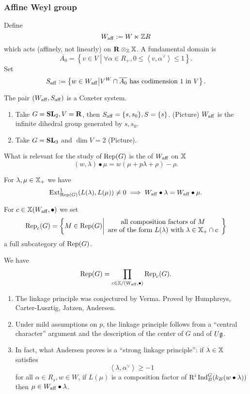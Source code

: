 		\subsubsection{Affine Weyl group}
		Define
		\[
			W_{\mathrm{aff}} := W\ltimes \mathbb Z R
		\]
		which acts (affinely, not linearly) on $\mathbf{R}\otimes_\mathbb Z \mathbb{X}$. A fundamental domain is
		\[
			\overline{A_0} = \left\{ v\in V \middle| \forall \alpha\in R_+, 0\le \left<v,\alpha
			^{\vee} \right>\le 1 \right\} .
		\]
		Set
		\[
			S_{\mathrm{aff}}:= \left\{ w\in W_{\mathrm{aff}} \middle| V^{W}\cap \overline{A_0}\text{ has codimension
			1 in }V \right\}.
		\]
		\begin{fact}
			The pair $(W_{\mathrm{aff}},S_{\mathrm{aff}})$ is a Coxeter system.
		\end{fact}
		\begin{example}\leavevmode
			\begin{enumerate}[(1)]
				\item Take $G=\mathbf{SL}_2, V=\mathbf{R}$, then $S_{\mathrm{aff}}=\{s,s_0\} , S=\{s\} $. (Picture) $W_{\mathrm{aff}}$ is
					the infinite dihedral group generated by $s,s_0$.
				\item Take $G=\mathbf{SL}_3$ and $\dim V=2$ (Picture).
			\end{enumerate}
		\end{example}
		What is relevant for the study of $\operatorname{Rep}(G)$ is the  of $W_{\mathrm{aff}}$ on $\mathbb{X}$
		\[
			(w,\lambda)\bullet \mu = w(\mu + p\lambda + \rho) - \rho.
		\]
		\begin{theorem}
			For $\lambda,\mu\in \mathbb{X}_+$ we have
			\[
				\operatorname{Ext}_{\operatorname{Rep}(G)}^{1}(L(\lambda), L(\mu)) \neq 0 \implies W_{\mathrm{aff}}\bullet \lambda = W_{\mathrm{aff}}\bullet \mu.
			\]
		\end{theorem}
		For $c\in \mathbb{X}(W_{\mathrm{aff}},\bullet)$ we set
		\[
			\operatorname{Rep}_c(G) = \left\{ M\in \operatorname{Rep}(G) \middle|
				\begin{array}{c}
					\text{all composition factors of }M \\
					\text{are of the form }L(\lambda)\text{ with }\lambda\in \mathbb{X}_+\cap c
			\end{array}\right\}
		\]
		a full subcategory of $\operatorname{Rep}(G)$.
		\begin{corollary}
			We have
			\[
				\operatorname{Rep}(G) = \prod_{c\in \mathbb{X} / (W_{\mathrm{aff}},\bullet)}\operatorname{Rep}_c(G).
			\]
		\end{corollary}
		\begin{remark}\leavevmode
			\begin{enumerate}[(1)]
				\item The linkage principle was conjectured by Verma. Proved by Humphreys,
					Carter-Lusztig, Jatzen, Andersen.
				\item Under mild assumptions on $p$, the linkage principle follows from a ``central
					character'' argument and the description of the center of $G$ and of $U\mathfrak g$.
				\item In fact, what Andersen proves is a ``strong linkage principle'': if $\lambda\in
					\mathbb{X}$ satisfies
					\[
						\left<\lambda, \alpha ^{\vee} \right> \ge -1
					\]
					for all $\alpha\in R_s, w\in W$, if $L(\mu)$ is a composition factor of
					$\mathrm{R}^{i}\operatorname{Ind}_B^{G}(k_B(w\bullet\lambda))$ then $\mu\in W_{\mathrm{aff}}\bullet \lambda$.
			\end{enumerate}
		\end{remark}
